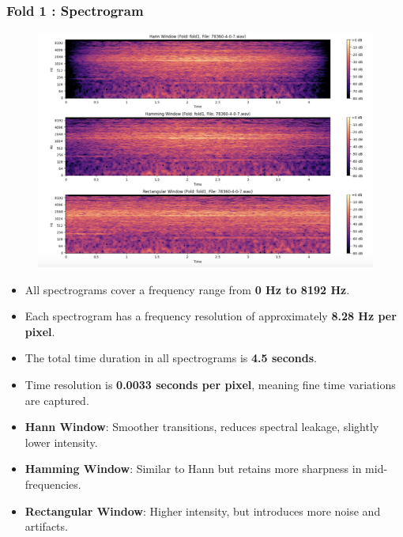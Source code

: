 \documentclass[a4paper,12pt]{article}
\begin{document}
    \subsubsection{Fold 1 : Spectrogram}
    \begin{figure}[H]
        \centering
        \includegraphics[width=1\linewidth]{Fold1.png}
    \end{figure}
    \begin{itemize}
        \item All spectrograms cover a frequency range from \textbf{0 Hz to 8192 Hz}.
        \item Each spectrogram has a frequency resolution of approximately \textbf{8.28 Hz per pixel}.
        \item The total time duration in all spectrograms is \textbf{4.5 seconds}.
        \item Time resolution is \textbf{0.0033 seconds per pixel}, meaning fine time variations are captured.
        \item \textbf{Hann Window}: Smoother transitions, reduces spectral leakage, slightly lower intensity.
        \item \textbf{Hamming Window}: Similar to Hann but retains more sharpness in mid-frequencies.
        \item \textbf{Rectangular Window}: Higher intensity, but introduces more noise and artifacts.
    \end{itemize}
\newpage
\end{document}
